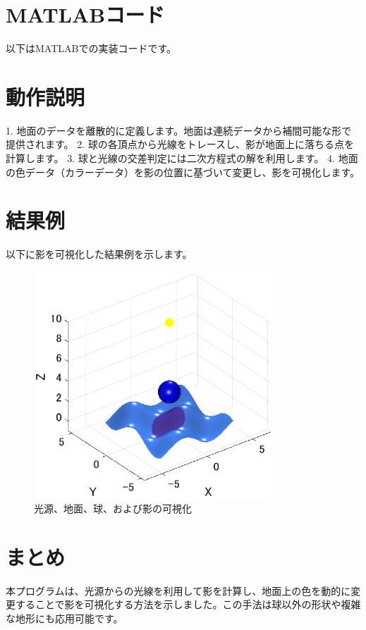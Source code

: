 \documentclass[a4paper,12pt]{article}
\begin{document}
\section*{MATLABコード}
以下はMATLABでの実装コードです。



\section*{動作説明}
1. 地面のデータを離散的に定義します。地面は連続データから補間可能な形で提供されます。
2. 球の各頂点から光線をトレースし、影が地面上に落ちる点を計算します。
3. 球と光線の交差判定には二次方程式の解を利用します。
4. 地面の色データ（カラーデータ）を影の位置に基づいて変更し、影を可視化します。

\section*{結果例}
以下に影を可視化した結果例を示します。

\begin{figure}[h]
    \centering
    \includegraphics[width=0.8\textwidth]{shadow_example.eps}
    \caption{光源、地面、球、および影の可視化}
\end{figure}

\section*{まとめ}
本プログラムは、光源からの光線を利用して影を計算し、地面上の色を動的に変更することで影を可視化する方法を示しました。この手法は球以外の形状や複雑な地形にも応用可能です。
\end{document}
